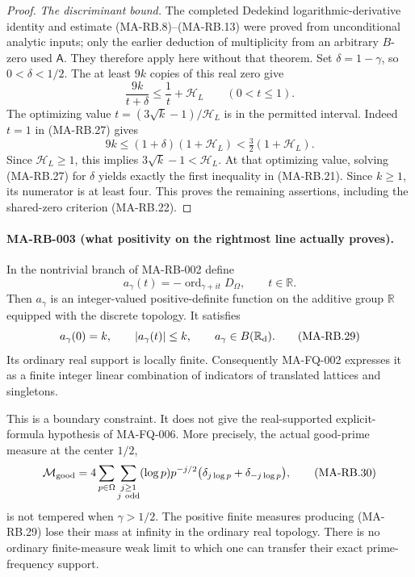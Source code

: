 \begin{proof}
\emph{The discriminant bound.}
The completed Dedekind logarithmic-derivative identity
and estimate (MA-RB.8)--(MA-RB.13) were proved from
unconditional analytic inputs; only the earlier deduction
of multiplicity from an arbitrary \(B\)-zero used
\(\mathsf A\).
They therefore apply here without that theorem.
Set \(\delta=1-\gamma\), so \(0<\delta<1/2\).
The at least \(9k\) copies of this real zero give
\[
                 \frac{9k}{t+\delta}
                     \le\frac1t+\mathcal H_L
                                  \qquad(0<t\le1).
 \tag{MA-RB.27}
\]
The optimizing value \(t=(3\sqrt{k}-1)/\mathcal H_L\)
is in the permitted interval.
Indeed \(t=1\) in (MA-RB.27) gives
\[
        9k\le(1+\delta)(1+\mathcal H_L)
                    <\tfrac32(1+\mathcal H_L).
\]
Since \(\mathcal H_L\ge1\), this implies
\(3\sqrt{k}-1<\mathcal H_L\).
At that optimizing value, solving (MA-RB.27) for
\(\delta\) yields exactly the first inequality in
(MA-RB.21).  Since \(k\ge1\), its numerator is at least
four.  This proves the remaining assertions, including
the shared-zero criterion (MA-RB.22).
\end{proof}

\paragraph{MA-RB-003 (what positivity on the rightmost line actually proves).}
In the nontrivial branch of MA-RB-002 define
\[
                    a_\gamma(t)=
                       -\operatorname{ord}_{\gamma+it}D_\Omega,
                              \qquad t\in\mathbb R .
 \tag{MA-RB.28}
\]
Then \(a_\gamma\) is an integer-valued positive-definite
function on the additive group \(\mathbb R\) equipped with
the discrete topology.  It satisfies
\[
        a_\gamma(0)=k,\qquad |a_\gamma(t)|\le k,
                         \qquad a_\gamma\in B(\mathbb R_{\rm d}).
 \tag{MA-RB.29}
\]
Its ordinary real support is locally finite.
Consequently MA-FQ-002 expresses it as a finite integer
linear combination of indicators of translated lattices
and singletons.

This is a boundary constraint.  It does not give the
real-supported explicit-formula hypothesis of MA-FQ-006.
More precisely, the actual good-prime measure at the
center \(1/2\),
\[
 \mathcal M_{\rm good}
   =4\sum_{p\in\Omega}\sum_{\substack{j\ge1\\j\ {\rm odd}}}
       (\log p)p^{-j/2}
             \bigl(\delta_{j\log p}+\delta_{-j\log p}\bigr),
 \tag{MA-RB.30}
\]
is not tempered when \(\gamma>1/2\).
The positive finite measures producing (MA-RB.29) lose
their mass at infinity in the ordinary real topology.
There is no ordinary finite-measure weak limit to which
one can transfer their exact prime-frequency support.

